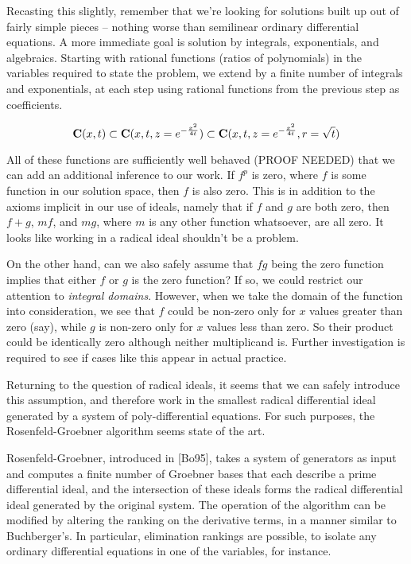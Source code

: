 \documentclass{article}
\newcommand{\C}{\ensuremath{{\bf C}}}
\begin{document}
Recasting this slightly, remember that we're looking for solutions
built up out of fairly simple pieces -- nothing worse than semilinear
ordinary differential equations.  A more immediate goal is solution by
integrals, exponentials, and algebraics.  Starting with rational
functions (ratios of polynomials) in the variables required to state
the problem, we extend by a finite number of integrals and
exponentials, at each step using rational functions from the previous
step as coefficients.

$$\C(x,t) \subset \C(x,t,z=e^{-\frac{x^2}{4t}}) \subset \C(x,t,z=e^{-\frac{x^2}{4t}},r=\sqrt{t})$$

All of these functions are sufficiently well behaved (PROOF NEEDED)
that we can add an additional inference to our work.  If $f^p$ is
zero, where $f$ is some function in our solution space, then $f$ is
also zero.  This is in addition to the axioms implicit in our use of
ideals, namely that if $f$ and $g$ are both zero, then $f+g$, $mf$,
and $mg$, where $m$ is any other function whatsoever, are all zero.
It looks like working in a radical ideal shouldn't be a problem.

On the other hand, can we also safely assume that $fg$ being the zero
function implies that either $f$ or $g$ is the zero function?  If so,
we could restrict our attention to {\it integral domains}.  However,
when we take the domain of the function into consideration, we see
that $f$ could be non-zero only for $x$ values greater than zero
(say), while $g$ is non-zero only for $x$ values less than zero.  So
their product could be identically zero although neither multiplicand
is.  Further investigation is required to see if cases like this
appear in actual practice.

Returning to the question of radical ideals, it seems that we can
safely introduce this assumption, and therefore work in the smallest
radical differential ideal generated by a system of poly-differential
equations.  For such purposes, the Rosenfeld-Groebner algorithm seems
state of the art.

Rosenfeld-Groebner, introduced in [Bo95], takes a system of generators
as input and computes a finite number of Groebner bases that each
describe a prime differential ideal, and the intersection of these
ideals forms the radical differential ideal generated by the original
system.  The operation of the algorithm can be modified by altering
the ranking on the derivative terms, in a manner similar to
Buchberger's.  In particular, elimination rankings are possible, to
isolate any ordinary differential equations in one of the variables,
for instance.
\end{document}
